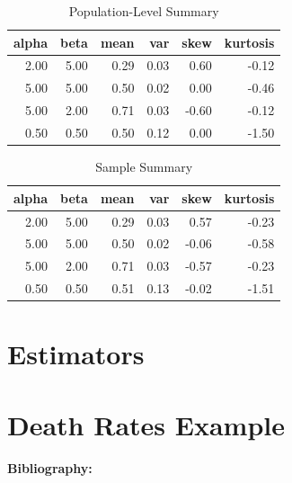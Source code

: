 \documentclass{article}\usepackage[]{graphicx}\usepackage[]{xcolor}
\begin{document}
\begin{multicols}{2}
\begin{table}[H]
\centering
\begingroup\small
\begin{tabular}{rrrrrr}
  \hline
alpha & beta & mean & var & skew & kurtosis \\ 
  \hline
2.00 & 5.00 & 0.29 & 0.03 & 0.60 & -0.12 \\ 
  5.00 & 5.00 & 0.50 & 0.02 & 0.00 & -0.46 \\ 
  5.00 & 2.00 & 0.71 & 0.03 & -0.60 & -0.12 \\ 
  0.50 & 0.50 & 0.50 & 0.12 & 0.00 & -1.50 \\ 
   \hline
\end{tabular}
\endgroup
\caption{Population-Level Summary} 
\label{populationsummary}
\end{table}


\begin{table}[H]
\centering
\begingroup\small
\begin{tabular}{rrrrrr}
  \hline
alpha & beta & mean & var & skew & kurtosis \\ 
  \hline
2.00 & 5.00 & 0.29 & 0.03 & 0.57 & -0.23 \\ 
  5.00 & 5.00 & 0.50 & 0.02 & -0.06 & -0.58 \\ 
  5.00 & 2.00 & 0.71 & 0.03 & -0.57 & -0.23 \\ 
  0.50 & 0.50 & 0.51 & 0.13 & -0.02 & -1.51 \\ 
   \hline
\end{tabular}
\endgroup
\caption{Sample Summary} 
\label{samplestatistics}
\end{table}


\section{Estimators}


\section{Death Rates Example}


\vspace{2em}

\noindent\textbf{Bibliography:} 

\begin{tiny}

\end{tiny}


\end{multicols}
\end{document}
